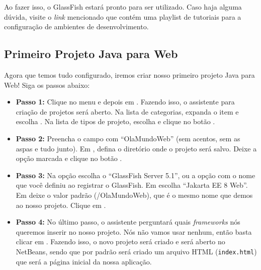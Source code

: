 Ao fazer isso, o GlassFish estará pronto para ser utilizado. Caso haja alguma dúvida, visite o \textit{link} mencionado que contém uma playlist de tutoriais para a configuração de ambientes de desenvolvimento.


\subsection{Primeiro Projeto Java para Web}

Agora que temos tudo configurado, iremos criar nosso primeiro projeto Java para Web! Siga os passos abaixo:

\begin{itemize}

    \item \textbf{Passo 1:} Clique no menu  e depois em  . Fazendo isso, o assistente para criação de projetos será aberto. Na lista de categorias, expanda o item   e escolha  . Na lista de tipos de projeto, escolha   e clique no botão  . 
    
    \item \textbf{Passo 2:} Preencha o campo  com ``OlaMundoWeb'' (sem acentos, sem as aspas e tudo junto). Em , defina o diretório onde o projeto será salvo. Deixe a opção  marcada e clique no botão .
    
    \item \textbf{Passo 3:} Na opção  escolha o ``GlassFish Server 5.1'', ou a opção com o nome que você definiu ao registrar o GlassFish. Em  escolha ``Jakarta EE 8 Web''. Em  deixe o valor padrão (/OlaMundoWeb), que é o mesmo nome que demos ao nosso projeto. Clique em .
    
    \item \textbf{Passo 4:} No último passo, o assistente perguntará quais \textit{frameworks} nós queremos inserir no nosso projeto. Nós não vamos usar nenhum, então basta clicar em . Fazendo isso, o novo projeto será criado e será aberto no NetBeans, sendo que por padrão será criado um arquivo HTML (\texttt{index.html}) que será a página inicial da nossa aplicação.
    
\end{itemize}

